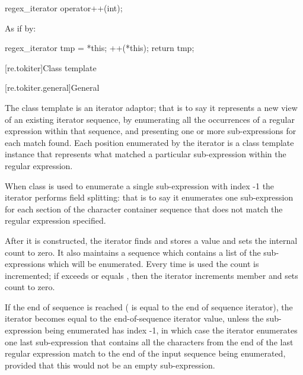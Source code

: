 %
\begin{itemdecl}
regex_iterator operator++(int);
\end{itemdecl}

\begin{itemdescr}
\pnum
\effects
As if by:
\begin{codeblock}
regex_iterator tmp = *this;
++(*this);
return tmp;
\end{codeblock}
\end{itemdescr}

[re.tokiter]{Class template }

[re.tokiter.general]{General}

\pnum
{}%
The class template  is an iterator adaptor; that
is to say it represents a new view of an existing iterator sequence,
by enumerating all the occurrences of a regular expression within that
sequence, and presenting one or more sub-expressions for each match
found. Each position enumerated by the iterator is a  class
template instance that represents what matched a particular sub-expression
within the regular expression.

\pnum
When class  is used to enumerate a
single sub-expression with index -1 the iterator performs field
splitting: that is to say it enumerates one sub-expression for each section of
the character container sequence that does not match the regular
expression specified.

\pnum
{}%
After it is constructed, the iterator finds and stores a value
and sets the internal count  to zero. It also maintains a sequence
 which contains a list of the sub-expressions which will be
enumerated. Every time  is used
the count  is incremented; if  exceeds or equals ,
then the iterator increments member 
and sets count  to zero.

\pnum
{}%
If the end of sequence is reached ( is equal to the end of
sequence iterator), the iterator becomes equal to the end-of-sequence
iterator value, unless the sub-expression being enumerated has index -1,
in which case the iterator enumerates one last sub-expression that contains
all the characters from the end of the last regular expression match to the
end of the input sequence being enumerated, provided that this would not be an
empty sub-expression.

